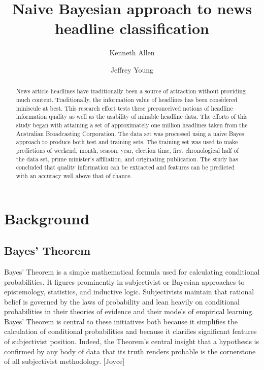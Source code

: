 \documentclass[format=acmlarge]{acmart}
\begin{document}
\title{Naive Bayesian approach to news headline classification}

\author{Kenneth Allen}

\author{Jeffrey Young}

\begin{abstract}
News article headlines have traditionally been a source of attraction without providing much content.  Traditionally, the information value of headlines has been considered miniscule at best. This research effort tests these preconceived notions of headline information quality as well as the usability of minable headline data.  The efforts of this study began with attaining a set of approximately one million headlines taken from the Australian Broadcasting Corporation.  The data set was processed using a naive Bayes approach to produce both test and training sets.  The training set was used to make predictions of weekend, month, season, year, election time, first chronological half of the data set, prime minister's affiliation, and originating publication.  The study has concluded that quality information can be extracted and features can be predicted with an accuracy well above that of chance.
\end{abstract}


\maketitle

\section{Background}
\subsection{Bayes' Theorem}
Bayes' Theorem is a simple mathematical formula used for calculating conditional probabilities. It figures prominently in subjectivist or Bayesian approaches to epistemology, statistics, and inductive logic. Subjectivists maintain that rational belief is governed by the laws of probability and lean heavily on conditional probabilities in their theories of evidence and their models of empirical learning. Bayes' Theorem is central to these initiatives both because it simplifies the calculation of conditional probabilities and because it clarifies significant features of subjectivist position. Indeed, the Theorem's central insight that a hypothesis is confirmed by any body of data that its truth renders probable is the cornerstone of all subjectivist methodology. [Joyce]
\end{document}
